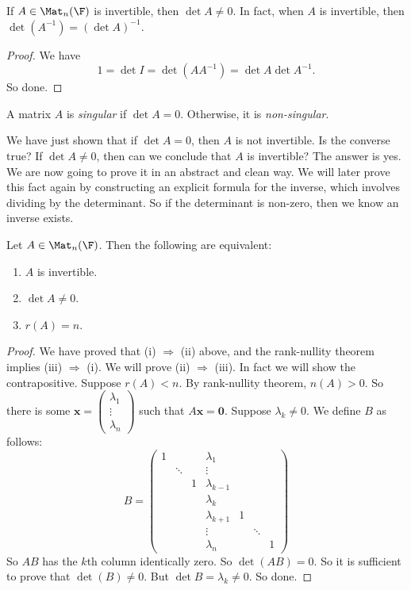\documentclass[a4paper]{article}
\begin{document}
\begin{cor}
  If $A \in \Mat_n(\F)$ is invertible, then $\det A \not= 0$. In fact, when $A$ is invertible, then $\det (A^{-1}) = (\det A)^{-1}$.
\end{cor}

\begin{proof}
  We have
  \[
    1 = \det I = \det(AA^{-1}) = \det A\det A^{-1}.
  \]
  So done.
\end{proof}

\begin{defi}
  A matrix $A$ is \emph{singular} if $\det A = 0$. Otherwise, it is \emph{non-singular}.
\end{defi}
We have just shown that if $\det A = 0$, then $A$ is not invertible. Is the converse true? If $\det A \not= 0$, then can we conclude that $A$ is invertible? The answer is yes. We are now going to prove it in an abstract and clean way. We will later prove this fact again by constructing an explicit formula for the inverse, which involves dividing by the determinant. So if the determinant is non-zero, then we know an inverse exists.

\begin{thm}
  Let $A \in \Mat_n(\F)$. Then the following are equivalent:
  \begin{enumerate}
    \item $A$ is invertible.
    \item $\det A \not= 0$.
    \item $r(A) = n$.
  \end{enumerate}
\end{thm}

\begin{proof}
  We have proved that (i) $\Rightarrow$ (ii) above, and the rank-nullity theorem implies (iii) $\Rightarrow$ (i). We will prove (ii) $\Rightarrow$ (iii). In fact we will show the contrapositive. Suppose $r(A) < n$. By rank-nullity theorem, $n(A) > 0$. So there is some $\mathbf{x} = \begin{pmatrix}\lambda_1\\\vdots\\\lambda_n\end{pmatrix}$ such that $A\mathbf{x} = \mathbf{0}$. Suppose $\lambda_k \not= 0$. We define $B$ as follows:
  \[
    B =
    \begin{pmatrix}
      1 & & & \lambda_1\\
      & \ddots & & \vdots\\
      & & 1 & \lambda_{k - 1}\\
      & & & \lambda_k\\
      & & & \lambda_{k + 1} & 1\\
      & & & \vdots & & \ddots\\
      & & & \lambda_n & & & 1
    \end{pmatrix}
  \]
  So $AB$ has the $k$th column identically zero. So $\det(AB) = 0$. So it is sufficient to prove that $\det (B) \not= 0$. But $\det B = \lambda_k \not= 0$. So done.
\end{proof}
\end{document}
